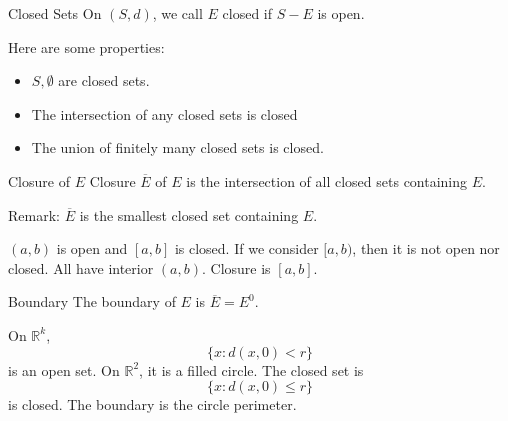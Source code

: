 \documentclass{report}
\begin{document}
\begin{definition}{Closed Sets}
    On $(S, d)$, we call $E$ closed if $S - E$ is open.
\end{definition}

Here are some properties:
    \begin{itemize}
        \item  $S, \emptyset$ are closed sets.

        \item The intersection of any closed sets is closed

        \item The union of finitely many closed sets is closed. 
    \end{itemize}

\begin{definition}{Closure of $E$}
    Closure $\overline{E}$ of $E$ is the intersection of all closed sets containing $E$.
\end{definition}

Remark: $\overline{E}$ is the smallest closed set containing $E$.

\begin{examples}
    \begin{example}
        $(a, b)$ is open and $[a, b]$ is closed. If we consider $[a, b)$, then it is not open nor closed. All have interior $(a, b)$. Closure is $[a, b]$.
    \end{example}
\end{examples}

\begin{definition}{Boundary}
    The boundary of $E$ is $\overline{E} = E^{0}$.
\end{definition}

\begin{examples}
    \begin{example}
        On $\mathbb{R}^{k}$,
            \begin{equation*}
                \{x : d(x, 0) < r\}
            \end{equation*}
        is an open set. On $\mathbb{R}^{2}$, it is a filled circle. The closed set is
            \begin{equation*}
                \{x : d(x, 0) \leq r\}
            \end{equation*}
        is closed. The boundary is the circle perimeter.
    \end{example}
\end{examples}
\end{document}

